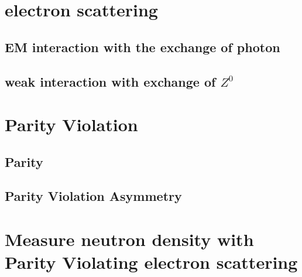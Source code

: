 \section{electron scattering}
\subsection{EM interaction with the exchange of photon}
\subsection{weak interaction with exchange of $Z^0$}

\section{Parity Violation}
\subsection{Parity}
\subsection{Parity Violation Asymmetry}

\section{Measure neutron density with Parity Violating electron scattering}

